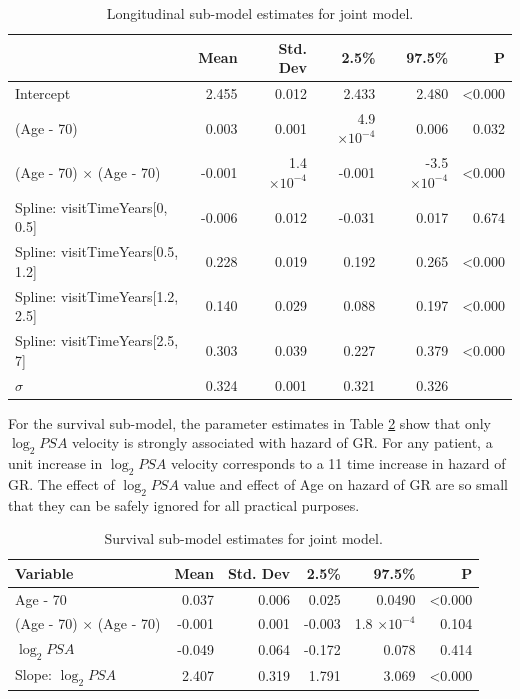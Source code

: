 \begin{table}[!htb]
\centering
\caption{Longitudinal sub-model estimates for joint model.}
\label{tab : PSA_long}
\captionsetup{justification=centering}
\begin{tabular}{@{}lrrrrr@{}}
\toprule
                                     & Mean   & Std. Dev           & 2.5\%               & 97.5\%              & P              \\ \midrule
Intercept                            &  2.455 & 0.012 & 2.433 & 2.480               & \textless0.000 \\
(Age - 70)                           & 0.003 & 0.001 & 4.9 $\times 10^{-4}$ & 0.006 & 0.032          \\
(Age - 70) $\times$ (Age - 70)       & -0.001 & 1.4 $\times 10^{-4}$ & -0.001 & -3.5 $\times 10^{-4}$ & \textless0.000 \\
Spline: visitTimeYears{[}0, 0.5{]}   & -0.006 & 0.012 & -0.031 & 0.017 & 0.674 \\
Spline: visitTimeYears{[}0.5, 1.2{]} & 0.228 & 0.019 & 0.192 & 0.265               & \textless0.000 \\
Spline: visitTimeYears{[}1.2, 2.5{]} & 0.140 & 0.029 & 0.088 & 0.197               & \textless0.000 \\
Spline: visitTimeYears{[}2.5, 7{]}   & 0.303 & 0.039 & 0.227 & 0.379               & \textless0.000 \\
$\sigma$                               & 0.324 & 0.001 & 0.321 & 0.326              &  \\ \bottomrule
\end{tabular}
\end{table}

For the survival sub-model, the parameter estimates in Table \ref{tab : PSA_survival} show that only $\log_2 PSA$ velocity is strongly associated with hazard of GR. For any patient, a unit increase in $\log_2 PSA$ velocity corresponds to a 11 time increase in hazard of GR. The effect of $\log_2 PSA$ value and effect of Age on hazard of GR are so small that they can be safely ignored for all practical purposes.

\begin{table}[!htb]
\centering
\caption{Survival sub-model estimates for joint model.}
\captionsetup{justification=centering}
\label{tab : PSA_survival}
\begin{tabular}{@{}lrrrrr@{}}
\toprule
Variable                      & Mean   & Std. Dev & 2.5\%  & 97.5\%                 & P              \\ \midrule
Age - 70                      & 0.037 & 0.006 & 0.025 & 0.0490                  & \textless0.000 \\
(Age - 70) $\times$ (Age - 70) & -0.001 & 0.001 & -0.003 & 1.8 $\times 10^{-4}$ & 0.104          \\
$\log_2 PSA$                  & -0.049 & 0.064 & -0.172 & 0.078 & 0.414         \\
Slope: $\log_2 PSA$           & 2.407 & 0.319 & 1.791 & 3.069 & \textless0.000 \\ \bottomrule
\end{tabular}
\end{table}


